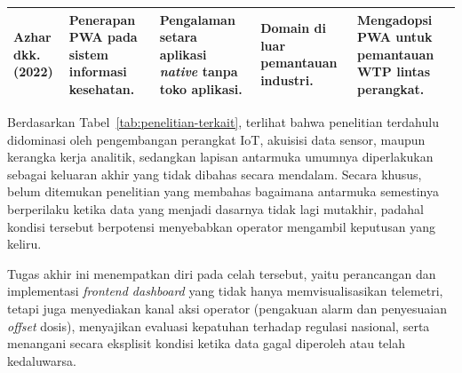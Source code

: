 \begin{table}[htbp]
\begin{tabular}{|p{1.8cm}|p{2.8cm}|p{3.2cm}|p{3.2cm}|p{3cm}|}
Azhar dkk. (2022) &
Penerapan PWA pada sistem informasi kesehatan. &
Pengalaman setara aplikasi \textit{native} tanpa toko aplikasi. &
Domain di luar pemantauan industri. &
Mengadopsi PWA untuk pemantauan WTP lintas perangkat. \\ \hline

\end{tabular}
\end{table}

Berdasarkan Tabel~\ref{tab:penelitian-terkait}, terlihat bahwa penelitian terdahulu didominasi oleh pengembangan
perangkat IoT, akuisisi data sensor, maupun kerangka kerja analitik, sedangkan lapisan antarmuka umumnya
diperlakukan sebagai keluaran akhir yang tidak dibahas secara mendalam. Secara khusus, belum ditemukan penelitian
yang membahas bagaimana antarmuka semestinya berperilaku ketika data yang menjadi dasarnya tidak lagi mutakhir,
padahal kondisi tersebut berpotensi menyebabkan operator mengambil keputusan yang keliru.

Tugas akhir ini menempatkan diri pada celah tersebut, yaitu perancangan dan implementasi \textit{frontend
dashboard} yang tidak hanya memvisualisasikan telemetri, tetapi juga menyediakan kanal aksi operator (pengakuan
alarm dan penyesuaian \textit{offset} dosis), menyajikan evaluasi kepatuhan terhadap regulasi nasional, serta
menangani secara eksplisit kondisi ketika data gagal diperoleh atau telah kedaluwarsa.